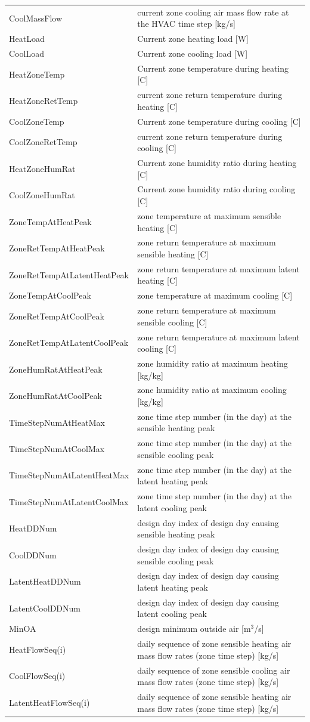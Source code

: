 \begin{longtable}[c]{p{1.85in}p{4.13in}}
CoolMassFlow & current zone cooling air mass flow rate at the HVAC time step [kg/s] \tabularnewline
HeatLoad & Current zone heating load [W] \tabularnewline
CoolLoad & Current zone cooling load [W] \tabularnewline
HeatZoneTemp & Current zone temperature during heating [C] \tabularnewline
HeatZoneRetTemp & current zone return temperature during heating [C] \tabularnewline
CoolZoneTemp & Current zone temperature during cooling [C] \tabularnewline
CoolZoneRetTemp & current zone return temperature during cooling [C] \tabularnewline
HeatZoneHumRat & Current zone humidity ratio during heating [C] \tabularnewline
CoolZoneHumRat & Current zone humidity ratio during cooling [C] \tabularnewline
ZoneTempAtHeatPeak & zone temperature at maximum sensible heating [C] \tabularnewline
ZoneRetTempAtHeatPeak & zone return temperature at maximum sensible heating [C] \tabularnewline
ZoneRetTempAtLatentHeatPeak & zone return temperature at maximum latent heating [C] \tabularnewline
ZoneTempAtCoolPeak & zone temperature at maximum cooling [C] \tabularnewline
ZoneRetTempAtCoolPeak & zone return temperature at maximum sensible cooling [C] \tabularnewline
ZoneRetTempAtLatentCoolPeak & zone return temperature at maximum latent cooling [C] \tabularnewline
ZoneHumRatAtHeatPeak & zone humidity ratio at maximum heating [kg/kg] \tabularnewline
ZoneHumRatAtCoolPeak & zone humidity ratio at maximum cooling [kg/kg] \tabularnewline
TimeStepNumAtHeatMax & zone time step number (in the day) at the sensible heating peak \tabularnewline
TimeStepNumAtCoolMax & zone time step number (in the day) at the sensible cooling peak \tabularnewline
TimeStepNumAtLatentHeatMax & zone time step number (in the day) at the latent heating peak \tabularnewline
TimeStepNumAtLatentCoolMax & zone time step number (in the day) at the latent cooling peak \tabularnewline
HeatDDNum & design day index of design day causing sensible heating peak \tabularnewline
CoolDDNum & design day index of design day causing sensible cooling peak \tabularnewline
LatentHeatDDNum & design day index of design day causing latent heating peak \tabularnewline
LatentCoolDDNum & design day index of design day causing latent cooling peak \tabularnewline
MinOA & design minimum outside air [m\(^{3}\)/s] \tabularnewline
HeatFlowSeq(i) & daily sequence of zone sensible heating air mass flow rates (zone time step) [kg/s] \tabularnewline
CoolFlowSeq(i) & daily sequence of zone sensible cooling air mass flow rates (zone time step) [kg/s] \tabularnewline
LatentHeatFlowSeq(i) & daily sequence of zone sensible heating air mass flow rates (zone time step) [kg/s] \tabularnewline

\end{longtable}
